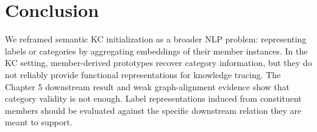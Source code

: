 \section{Conclusion}
We reframed semantic KC initialization as a broader NLP problem: representing labels or categories by aggregating embeddings of their member instances. In the KC setting, member-derived prototypes recover category information, but they do not reliably provide functional representations for knowledge tracing. The Chapter 5 downstream result and weak graph-alignment evidence show that category validity is not enough. Label representations induced from constituent members should be evaluated against the specific downstream relation they are meant to support.
